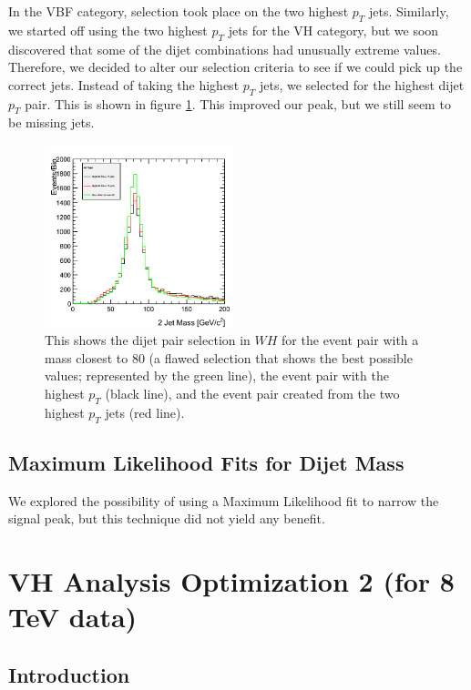 \documentclass[12pt]{article}
\begin{document}
In the VBF category, selection took place on the two highest $p_{T}$ jets. 
Similarly, we started off using the two highest $p_{T}$ jets for the VH category, 
but we soon discovered that some of the dijet combinations had unusually extreme values. 
Therefore, we decided to alter our selection criteria to see if we could pick up the correct jets. 
Instead of taking the highest $p_{T}$ jets, we selected for the highest dijet $p_{T}$ pair. This is shown 
in figure \ref{fig:dijetSel}. This improved our peak, but we still seem to be missing jets.
\begin{figure}[!hbtp]
\begin{center}
    \includegraphics[width=0.49\textwidth]{images/Hist_Reco2PlotsPt30Eta2.png}
    \caption{ \label{fig:dijetSel}
         This shows the dijet pair selection in $WH$ for the event pair with a mass closest to 80 (a flawed selection that 
	 shows the best possible values; represented by the green line), the event pair with the highest $p_{T}$ (black line), 
	 and the event pair created from the two highest $p_{T}$ jets (red line).
      }
\end{center}
\end{figure}

\subsection{Maximum Likelihood Fits for Dijet Mass}

We explored the possibility of using a Maximum Likelihood fit to narrow the signal peak, but this technique did not yield any benefit.

\section{VH Analysis Optimization 2 (for 8 TeV data)}

\subsection{Introduction}
\end{document}
